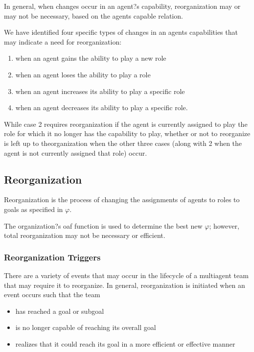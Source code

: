 In general, when changes occur in an agent?s capability, reorganization may or may not be necessary, based on the agents capable relation. 

We have identified four specific types of changes in an agents capabilities that may indicate a need for reorganization: 

\begin{enumerate}
\item 
	when an agent gains the ability to play a new role
\item
	when an agent loses the ability to play a role
\item
	when an agent increases its ability to play a specific role
\item
	when an agent decreases its ability to play a specific role.
\end{enumerate}	
 
While case 2 requires reorganization if the agent is currently assigned to play the role for which it no longer has the capability to play, whether or not to reorganize is left up to theorganization when the other three cases (along with 2 when the agent is not currently assigned that role) occur. \cite{omacs2}


\subsection{ Reorganization }
Reorganization is the process of changing the assignments of agents to roles to goals as specified
in $\varphi$.  \cite{omacs2}

The organization?s oaf function is used to determine the best new $\varphi$; however, total
reorganization may not be necessary or efficient.


\subsubsection{ Reorganization Triggers}


There are a variety of events that may occur in the lifecycle of a multiagent team that may require it to reorganize. In
general, reorganization is initiated when an event occurs such that the team\cite{omacs1}
\begin{itemize}
	\item has reached a goal or subgoal
	\item is no longer capable of reaching its overall goal
	\item realizes that it could reach its goal in a more efficient or effective manner
\end{itemize}
 

